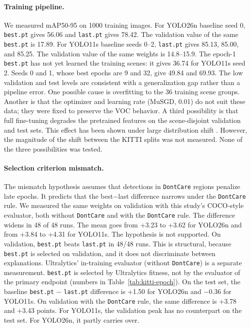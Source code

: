 \paragraph{Training pipeline.}
We measured mAP50-95 on 1000 training images. For YOLO26n baseline seed 0, \texttt{best.pt} gives 56.06 and \texttt{last.pt} gives 78.42. The validation value of the same \texttt{best.pt} is 17.89. For YOLO11s baseline seeds 0--2, \texttt{last.pt} gives 85.13, 85.00, and 85.25. The validation value of the same weights is 14.8--15.9. The epoch-1 \texttt{best.pt} has not yet learned the training scenes: it gives 36.74 for YOLO11s seed 2. Seeds 0 and 1, whose best epochs are 9 and 32, give 49.84 and 69.93. The low validation and test levels are consistent with a generalization gap rather than a pipeline error. One possible cause is overfitting to the 36 training scene groups. Another is that the optimizer and learning rate (MuSGD, 0.01) do not suit these data; they were fixed to preserve the VOC behavior. A third possibility is that full fine-tuning degrades the pretrained features on the scene-disjoint validation and test sets. This effect has been shown under large distribution shift \cite{kumar_2022_finetuning}. However, the magnitude of the shift between the KITTI splits was not measured. None of the three possibilities was tested.

\paragraph{Selection criterion mismatch.}
The mismatch hypothesis assumes that detections in \texttt{DontCare} regions penalize late epochs. It predicts that the best$-$last difference narrows under the \texttt{DontCare} rule. We measured the same weights on validation with this study's COCO-style evaluator, both without \texttt{DontCare} and with the \texttt{DontCare} rule. The difference widens in 48 of 48 runs. The mean goes from +3.23 to +3.62 for YOLO26n and from +3.84 to +4.31 for YOLO11s. The hypothesis is not supported. On validation, \texttt{best.pt} beats \texttt{last.pt} in 48/48 runs. This is structural, because \texttt{best.pt} is selected on validation, and it does not discriminate between explanations. Ultralytics' in-training evaluator (without \texttt{DontCare}) is a separate measurement. \texttt{best.pt} is selected by Ultralytics fitness, not by the evaluator of the primary endpoint (numbers in Table~\ref{tab:kitti-epoch}). On the test set, the baseline \texttt{best.pt} $-$ \texttt{last.pt} difference is +1.50 for YOLO26n and $-$0.36 for YOLO11s. On validation with the \texttt{DontCare} rule, the same difference is +3.78 and +3.43 points. For YOLO11s, the validation peak has no counterpart on the test set. For YOLO26n, it partly carries over.

